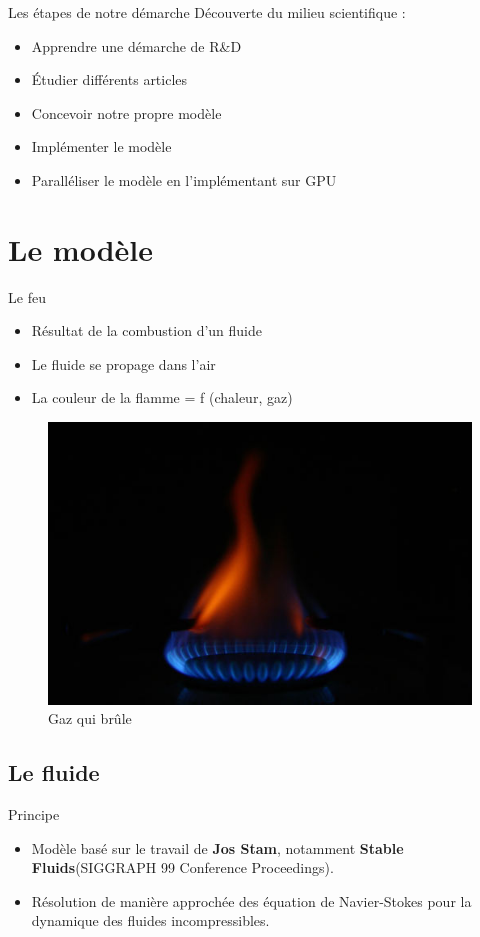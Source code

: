 \documentclass{beamer}
\begin{document}
\begin{frame}{Les étapes de notre démarche}
  Découverte du milieu scientifique :
  \begin{itemize}
  \item{Apprendre une démarche de R\&D} %
  \item{Étudier différents articles} %
  \item{Concevoir notre propre modèle} %
  \item{Implémenter le modèle} %
  \item{Paralléliser le modèle en l'implémentant sur GPU} %
  \end{itemize}
\end{frame}


\section{Le modèle}
\begin{frame}{Le feu}
  \begin{itemize}
  \item Résultat de la combustion d'un fluide
  \item Le fluide se propage dans l'air
  \item La couleur de la flamme = f (chaleur, gaz)
  \end{itemize}
  \begin{figure}[!h]
    \centering\includegraphics[scale=0.2]{Gaz.jpg}
    \caption{Gaz qui brûle}
    \label{Gaz}
  \end{figure}    
\end{frame}


\subsection{Le fluide}
\begin{frame}{Principe}
  \begin{itemize}
  \item Modèle basé sur le travail de \textbf{Jos Stam}, notamment
    \textbf{Stable Fluids}(SIGGRAPH 99 Conference Proceedings).
  \item Résolution de manière approchée des équation de Navier-Stokes
    pour la dynamique des fluides incompressibles.
  \end{itemize}
\end{frame}
\end{document}
